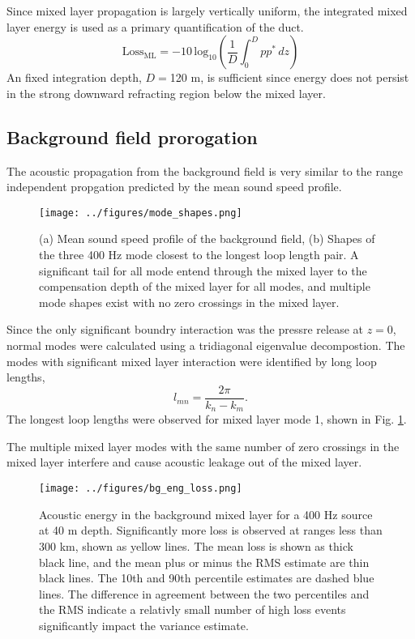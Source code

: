 \documentclass[preprint,NumberedRefs]{JASA}
\begin{document}
Since mixed layer propagation is largely vertically uniform, the integrated mixed layer energy is used as a primary quantification of the duct.
\begin{equation}
    \textrm{Loss}_{\textrm{ML}} = -10 \, \textrm{log}_{10} \left( \frac{1}{D} \int^{D}_0 p p^* \,  dz \right)
\end{equation}
An fixed integration depth, $D=$120 m, is sufficient since energy does not persist in the strong downward refracting region below the mixed layer.

\subsection{Background field prorogation}
The acoustic propagation from the background field is very similar to the range independent propgation predicted by the mean sound speed profile.
\begin{figure}
\texttt{[image: ../figures/mode\_shapes.png]}
    \caption{\label{fig:bg_modes}{(a) Mean sound speed profile of the background field, (b) Shapes of the three 400 Hz mode closest to the longest loop length pair. A significant tail for all mode entend through the mixed layer to the compensation depth of the mixed layer for all modes, and multiple mode shapes exist with no zero crossings in the mixed layer.}}
\end{figure}

Since the only significant boundry interaction was the pressre release at $z=0$, normal modes were calculated using a tridiagonal eigenvalue decompostion. The modes with significant mixed layer interaction were identified by long loop lengths,
\begin{equation}
    l_{mn} = \frac{2 \pi}{k_n - k_m}.
    \label{eq:loop_length}
\end{equation}
The longest loop lengths were observed for mixed layer mode 1, shown in Fig. \ref{fig:bg_modes}.

The multiple mixed layer modes with the same number of zero crossings in the mixed layer interfere and cause acoustic leakage out of the mixed layer.
\begin{figure}
\texttt{[image: ../figures/bg\_eng\_loss.png]}
    \caption{Acoustic energy in the background mixed layer for a 400 Hz source at 40 m depth. Significantly more loss is observed at ranges less than 300 km, shown as yellow lines. The mean loss is shown as thick black line, and the mean plus or minus the RMS estimate are thin black lines. The 10th and 90th percentile estimates are dashed blue lines. The difference in agreement between the two percentiles and the RMS indicate a relativly small number of high loss events significantly impact the variance estimate.}
    \label{fig:bg_eng}
\end{figure}
\end{document}
